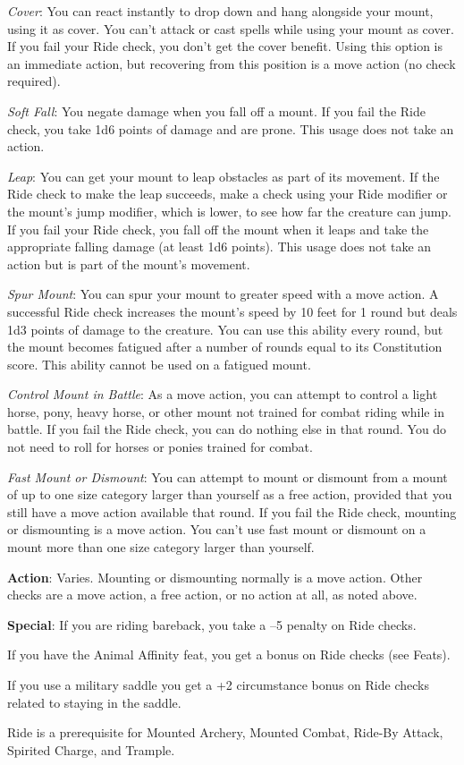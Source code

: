 \textit{Cover}: You can react instantly to drop down and hang alongside your mount, using it as cover. You can't attack or cast spells while using your mount as cover. If you fail your Ride check, you don't get the cover benefit. Using this option is an immediate action, but recovering from this position is a move action (no check required).
				
\textit{Soft Fall}: You negate damage when you fall off a mount. If you fail the Ride check, you take 1d6 points of damage and are prone. This usage does not take an action.
				
\textit{Leap}: You can get your mount to leap obstacles as part of its movement. If the Ride check to make the leap succeeds, make a check using your Ride modifier or the mount's jump modifier, which is lower, to see how far the creature can jump. If you fail your Ride check, you fall off the mount when it leaps and take the appropriate falling damage (at least 1d6 points). This usage does not take an action but is part of the mount's movement.
				
\textit{Spur Mount}: You can spur your mount to greater speed with a move action. A successful Ride check increases the mount's speed by 10 feet for 1 round but deals 1d3 points of damage to the creature. You can use this ability every round, but the mount becomes fatigued after a number of rounds equal to its Constitution score. This ability cannot be used on a fatigued mount.
				
\textit{Control Mount in Battle}: As a move action, you can attempt to control a light horse, pony, heavy horse, or other mount not trained for combat riding while in battle. If you fail the Ride check, you can do nothing else in that round. You do not need to roll for horses or ponies trained for combat.
				
\textit{Fast Mount or Dismount}: You can attempt to mount or dismount from a mount of up to one size category larger than yourself as a free action, provided that you still have a move action available that round. If you fail the Ride check, mounting or dismounting is a move action. You can't use fast mount or dismount on a mount more than one size category larger than yourself.
				
\textbf{Action}: Varies. Mounting or dismounting normally is a move action. Other checks are a move action, a free action, or no action at all, as noted above.
				
\textbf{Special}: If you are riding bareback, you take a --5 penalty on Ride checks.
				
If you have the Animal Affinity feat, you get a bonus on Ride checks (see Feats).
				
If you use a military saddle you get a +2 circumstance bonus on Ride checks related to staying in the saddle.
				
Ride is a prerequisite for Mounted Archery, Mounted Combat, Ride-By Attack, Spirited Charge, and Trample.
        	

